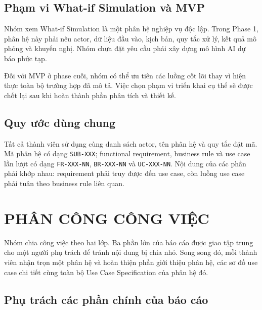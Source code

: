 \documentclass[10pt,a4paper]{article}
\begin{document}
\subsection{Phạm vi What-if Simulation và MVP}

Nhóm xem What-if Simulation là một phân hệ nghiệp vụ độc lập. Trong Phase 1, phân hệ này phải nêu actor, dữ liệu đầu vào, kịch bản, quy tắc xử lý, kết quả mô phỏng và khuyến nghị. Nhóm chưa đặt yêu cầu phải xây dựng mô hình AI dự báo phức tạp.

Đối với MVP ở phase cuối, nhóm có thể ưu tiên các luồng cốt lõi thay vì hiện thực toàn bộ trường hợp đã mô tả. Việc chọn phạm vi triển khai cụ thể sẽ được chốt lại sau khi hoàn thành phần phân tích và thiết kế.

\subsection{Quy ước dùng chung}

Tất cả thành viên sử dụng cùng danh sách actor, tên phân hệ và quy tắc đặt mã. Mã phân hệ có dạng \texttt{SUB-XXX}; functional requirement, business rule và use case lần lượt có dạng \texttt{FR-XXX-NN}, \texttt{BR-XXX-NN} và \texttt{UC-XXX-NN}. Nội dung của các phần phải khớp nhau: requirement phải truy được đến use case, còn luồng use case phải tuân theo business rule liên quan.

\section{PHÂN CÔNG CÔNG VIỆC}

Nhóm chia công việc theo hai lớp. Ba phần lớn của báo cáo được giao tập trung cho một người phụ trách để tránh nội dung bị chia nhỏ. Song song đó, mỗi thành viên nhận trọn một phân hệ và hoàn thiện phần giới thiệu phân hệ, các sơ đồ use case chi tiết cùng toàn bộ Use Case Specification của phân hệ đó.

\subsection{Phụ trách các phần chính của báo cáo}
\end{document}
